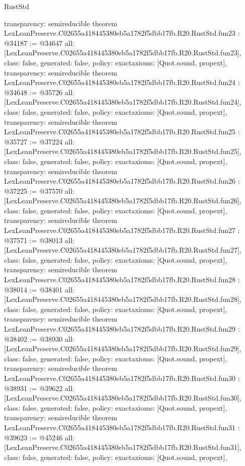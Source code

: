 \begin{lexlean}{RustStd}
\begin{coremodule}
{  transparency: semireducible
}
theorem LexLeanPreserve.C02655a418445380eb5a1782f5dbb17fb.R20.RustStd.fun23 : @34187 := @34647 {
  all: [LexLeanPreserve.C02655a418445380eb5a1782f5dbb17fb.R20.RustStd.fun23],
  class: false,
  generated: false,
  policy: exact{axioms: [Quot.sound, propext]},
  transparency: semireducible
}
theorem LexLeanPreserve.C02655a418445380eb5a1782f5dbb17fb.R20.RustStd.fun24 : @34648 := @35726 {
  all: [LexLeanPreserve.C02655a418445380eb5a1782f5dbb17fb.R20.RustStd.fun24],
  class: false,
  generated: false,
  policy: exact{axioms: [Quot.sound, propext]},
  transparency: semireducible
}
theorem LexLeanPreserve.C02655a418445380eb5a1782f5dbb17fb.R20.RustStd.fun25 : @35727 := @37224 {
  all: [LexLeanPreserve.C02655a418445380eb5a1782f5dbb17fb.R20.RustStd.fun25],
  class: false,
  generated: false,
  policy: exact{axioms: [Quot.sound, propext]},
  transparency: semireducible
}
theorem LexLeanPreserve.C02655a418445380eb5a1782f5dbb17fb.R20.RustStd.fun26 : @37225 := @37570 {
  all: [LexLeanPreserve.C02655a418445380eb5a1782f5dbb17fb.R20.RustStd.fun26],
  class: false,
  generated: false,
  policy: exact{axioms: [Quot.sound, propext]},
  transparency: semireducible
}
theorem LexLeanPreserve.C02655a418445380eb5a1782f5dbb17fb.R20.RustStd.fun27 : @37571 := @38013 {
  all: [LexLeanPreserve.C02655a418445380eb5a1782f5dbb17fb.R20.RustStd.fun27],
  class: false,
  generated: false,
  policy: exact{axioms: [Quot.sound, propext]},
  transparency: semireducible
}
theorem LexLeanPreserve.C02655a418445380eb5a1782f5dbb17fb.R20.RustStd.fun28 : @38014 := @38401 {
  all: [LexLeanPreserve.C02655a418445380eb5a1782f5dbb17fb.R20.RustStd.fun28],
  class: false,
  generated: false,
  policy: exact{axioms: [Quot.sound, propext]},
  transparency: semireducible
}
theorem LexLeanPreserve.C02655a418445380eb5a1782f5dbb17fb.R20.RustStd.fun29 : @38402 := @38930 {
  all: [LexLeanPreserve.C02655a418445380eb5a1782f5dbb17fb.R20.RustStd.fun29],
  class: false,
  generated: false,
  policy: exact{axioms: [Quot.sound, propext]},
  transparency: semireducible
}
theorem LexLeanPreserve.C02655a418445380eb5a1782f5dbb17fb.R20.RustStd.fun30 : @38931 := @39622 {
  all: [LexLeanPreserve.C02655a418445380eb5a1782f5dbb17fb.R20.RustStd.fun30],
  class: false,
  generated: false,
  policy: exact{axioms: [Quot.sound, propext]},
  transparency: semireducible
}
theorem LexLeanPreserve.C02655a418445380eb5a1782f5dbb17fb.R20.RustStd.fun31 : @39623 := @45246 {
  all: [LexLeanPreserve.C02655a418445380eb5a1782f5dbb17fb.R20.RustStd.fun31],
  class: false,
  generated: false,
  policy: exact{axioms: [Quot.sound, propext]},
}
\end{coremodule}
\end{lexlean}
